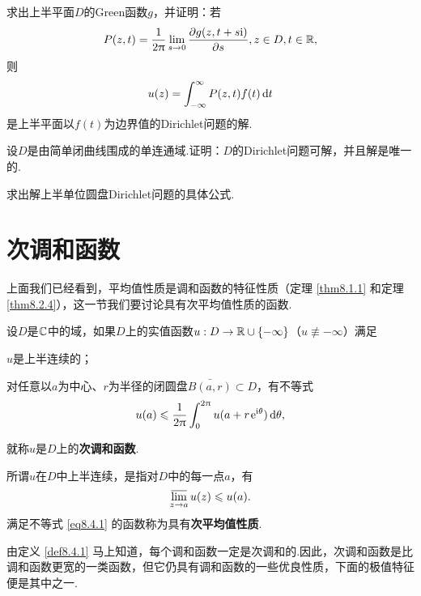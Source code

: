 \begin{xiti}
  \item 求出上半平面$D$的Green函数$g$，并证明：若
    \[
      P(z,t) = \frac1{2\pi}\lim_{s\to0}\pp{g(z,t+s\ii)}s,z\in D,t\in\MR,
    \]
    则
    \[
      u(z) = \int_{-\infty}^\infty P(z,t)f(t)\dif t
    \]
    是上半平面以$f(t)$为边界值的Dirichlet问题的解.
  \item 设$D$是由简单闭曲线围成的单连通域.证明：$D$的Dirichlet问题可解，并且解是唯一的.
  \item 求出解上半单位圆盘Dirichlet问题的具体公式.
\end{xiti}

\section{次调和函数\label{sec8.4}}
上面我们已经看到，平均值性质是调和函数的特征性质（定理 \ref{thm8.1.1} 和定理 \ref{thm8.2.4}），这一节我们要讨论具有次平均值性质的函数.
\begin{definition}\label{def8.4.1}
  设$D$是$\MC$中的域，如果$D$上的实值函数$u:D\to\MR\cup\{-\infty\}$（$u\not\equiv-\infty$）满足
  \begin{eenum}
    \item $u$是上半连续的；
    \item 对任意以$a$为中心、$r$为半径的闭圆盘$\bar{B(a,r)}\subset D$，有不等式
      \begin{equation}\label{eq8.4.1}
        u(a) \le \frac1{2\pi}\int_0^{2\pi}u(a+r\ee^{\ii\theta})\dif \theta,
      \end{equation}
  \end{eenum}
  就称$u$是$D$上的\textbf{次调和函数}.
\end{definition}

所谓$u$在$D$中上半连续，是指对$D$中的每一点$a$，有
\[
  \varlimsup_{z\to a}u(z) \le u(a).
\]
满足不等式 \eqref{eq8.4.1} 的函数称为具有\textbf{次平均值性质}.

由定义 \ref{def8.4.1} 马上知道，每个调和函数一定是次调和的.因此，次调和函数是比调和函数更宽的一类函数，但它仍具有调和函数的一些优良性质，下面的极值特征便是其中之一.

